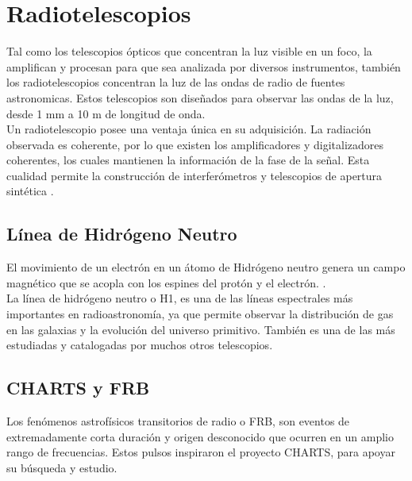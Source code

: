 \section{Radiotelescopios}

Tal como los telescopios ópticos que concentran la luz visible en un foco, la amplifican y procesan para que sea analizada por diversos instrumentos, también los radiotelescopios concentran la luz de las ondas de radio de fuentes astronomicas. Estos telescopios son diseñados para observar las ondas de la luz, desde 1 mm a 10 m de longitud de onda. \cite{nraoRadioTelescopes}\\

Un radiotelescopio posee una ventaja única en su adquisición. La radiación observada es coherente, por lo que existen los amplificadores y digitalizadores coherentes, los cuales mantienen la información de la fase de la señal. Esta cualidad permite la construcción de interferómetros y telescopios de apertura sintética \cite{Ransom2016}.\\ 

\subsection{Línea de Hidrógeno Neutro}

El movimiento de un electrón en un átomo de Hidrógeno neutro genera un campo magnético que se acopla con los espines del protón y el electrón.  \cite{Restrepo2023}.\\

La línea de hidrógeno neutro o H1, es una de las líneas espectrales más importantes en radioastronomía, ya que permite observar la distribución de gas en las galaxias y la evolución del universo primitivo. También es una de las más estudiadas y catalogadas por muchos otros telescopios.\\

\subsection{CHARTS y FRB}

Los fenómenos astrofísicos transitorios de radio o FRB, son eventos de extremadamente corta duración y origen desconocido que ocurren en un amplio rango de frecuencias. Estos pulsos inspiraron el proyecto CHARTS, para apoyar su búsqueda y estudio.\\

